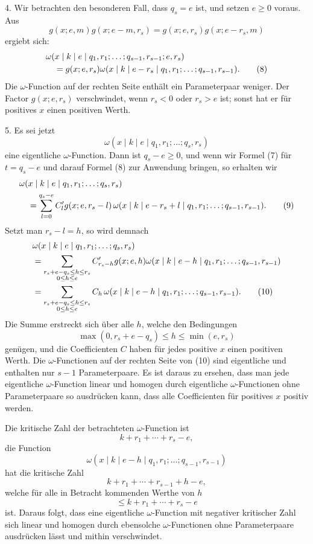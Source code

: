 4. Wir betrachten den besonderen Fall, dass $q_s=e$ ist, und setzen $e\ge0$ voraus. Aus
\[
 g(x;e,m)g(x;e-m,r_s)=g(x;e,r_s)g(x;e-r_s,m)
\]
ergiebt sich:
\begin{align}
&\omega(x\mid k\mid e\mid q_1,r_1;\ldots;q_{s-1},r_{s-1};e,r_s)\notag\\
&\quad=g(x;e,r_s)\omega(x\mid k\mid e-r_s\mid q_1,r_1;\ldots;q_{s-1},r_{s-1}).
\tag{8}
\end{align}
Die $\omega$-Function auf der rechten Seite enthält ein Parameterpaar weniger. Der Factor $g(x;e,r_s)$ verschwindet, wenn $r_s<0$ oder $r_s>e$ ist; sonst hat er für positives $x$ einen positiven Werth.

5. Es sei jetzt
\[
 \omega(x\mid k\mid e\mid q_1,r_1;\ldots;q_s,r_s)
\]
eine eigentliche $\omega$-Function. Dann ist $q_s-e\ge0$, und wenn wir Formel (7) für $t=q_s-e$ und darauf Formel (8) zur Anwendung bringen, so erhalten wir
\begin{align}
&\omega(x\mid k\mid e\mid q_1,r_1;\ldots;q_s,r_s)\notag\\
&\quad=\sum_{l=0}^{q_s-e}C'_l g(x;e,r_s-l)\,
 \omega(x\mid k\mid e-r_s+l\mid q_1,r_1;\ldots;q_{s-1},r_{s-1}).
\tag{9}
\end{align}
Setzt man $r_s-l=h$, so wird demnach
\begin{align}
&\omega(x\mid k\mid e\mid q_1,r_1;\ldots;q_s,r_s)\notag\\
&=\sum_{\substack{r_s+e-q_s\le h\le r_s\\0\le h\le e}}
 C'_{r_s-h}g(x;e,h)\omega(x\mid k\mid e-h\mid q_1,r_1;\ldots;q_{s-1},r_{s-1})\notag\\
&=\sum_{\substack{r_s+e-q_s\le h\le r_s\\0\le h\le e}}
 C_h\,\omega(x\mid k\mid e-h\mid q_1,r_1;\ldots;q_{s-1},r_{s-1}).
\tag{10}
\end{align}
Die Summe erstreckt sich über alle $h$, welche den Bedingungen
\[
 \max(0,r_s+e-q_s)\le h\le \min(e,r_s)
\]
genügen, und die Coefficienten $C$ haben für jedes positive $x$ einen positiven Werth. Die $\omega$-Functionen auf der rechten Seite von (10) sind eigentliche und enthalten nur $s-1$ Parameterpaare. Es ist daraus zu ersehen, dass man jede eigentliche $\omega$-Function linear und homogen durch eigentliche $\omega$-Functionen ohne Parameterpaare so ausdrücken kann, dass alle Coefficienten für positives $x$ positiv werden.

Die kritische Zahl der betrachteten $\omega$-Function ist
\[
 k+r_1+\cdots+r_s-e,
\]
die Function
\[
 \omega(x\mid k\mid e-h\mid q_1,r_1;\ldots;q_{s-1},r_{s-1})
\]
hat die kritische Zahl
\[
 k+r_1+\cdots+r_{s-1}+h-e,
\]
welche für alle in Betracht kommenden Werthe von $h$
\[
 \le k+r_1+\cdots+r_s-e
\]
ist. Daraus folgt, dass eine eigentliche $\omega$-Function mit negativer kritischer Zahl sich linear und homogen durch ebensolche $\omega$-Functionen ohne Parameterpaare ausdrücken lässt und mithin verschwindet.

